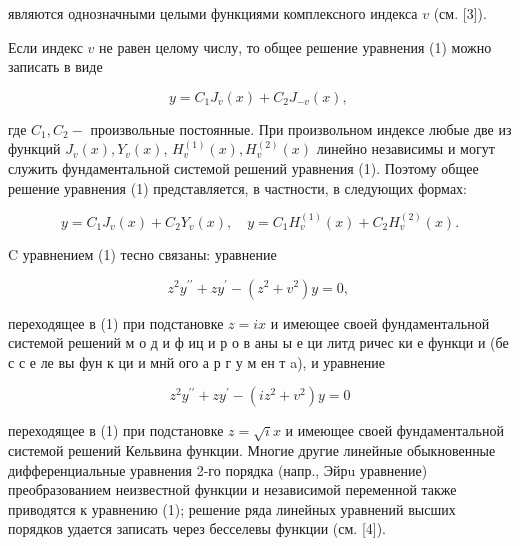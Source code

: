 \documentclass[10pt]{article}
\begin{document}
являются однозначными целыми функциями комплексного индекса $v$ (см. [3]).



Если индекс $v$ не равен целому числу, то общее решение уравнения (1) можно записать в виде



\[

y=C_{1} J_{v}(x)+C_{2} J_{-v}(x) \text {, }

\]



где $C_{1}, C_{2}-$ произвольные постоянные. При произвольном индексе любые две из функций $J_{v}(x), Y_{v}(x)$, $H_{v}^{(1)}(x), H_{v}^{(2)}(x)$ линейно независимы и могут служить фундаментальной системой решений уравнения (1). Поэтому общее решение уравнения (1) представляется, в частности, в следующих формах:



\[

y=C_{1} J_{v}(x)+C_{2} Y_{v}(x), \quad y=C_{1} H_{v}^{(1)}(x)+C_{2} H_{v}^{(2)}(x) .

\]



C уравнением (1) тесно связаны: уравнение



\[

z^{2} y^{\prime \prime}+z y^{\prime}-\left(z^{2}+v^{2}\right) y=0 \text {, }

\]



переходящее в (1) при подстановке $z=i x$ и имеющее своей фундаментальной системой решений м о д и ф иц и р о в аны ы е ци литд ричес ки е функци и (бе с с е ле вы фун к ци и мнй ого а р г у м ен т a), и уравнение



\[

z^{2} y^{\prime \prime}+z y^{\prime}-\left(i z^{2}+v^{2}\right) y=0

\]



переходящее в (1) при подстановке $z=\sqrt{i} x$ и имеющее своей фундаментальной системой решений Кельвина функции. Многие другие линейные обыкновенные дифференциальные уравнения 2-го порядка (напр., Эйрu уравнение) преобразованием неизвестной функции и независимой переменной также приводятся к уравнению (1); решение ряда линейных уравнений высших порядков удается записать через бесселевы функции (см. [4]).
\end{document}
